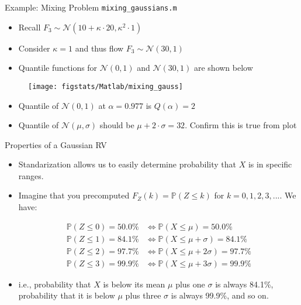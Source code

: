 \documentclass[9pt]{beamer}
\begin{document}
\begin{frame}{Example: Mixing Problem \footnotesize{\texttt{mixing\_gaussians.m}}}
\begin{itemize}
\setlength{\itemsep}{10pt}
\item Recall $F_3\sim\mathcal{N}(10+\kappa\cdot 20,\kappa^2\cdot 1)$
\item Consider $\kappa=1$ and thus flow $F_3\sim\mathcal{N}(30,1)$
\item Quantile functions for  $\mathcal{N}(0,1)$ and $\mathcal{N}(30,1)$ are shown below
\end{itemize}
\begin{figure}[!htb]
    \centering
	\texttt{[image: figstats/Matlab/mixing\_gauss]}
\end{figure}
\begin{itemize}
\item Quantile of $\mathcal{N}(0,1)$ at $\alpha=0.977$ is  $Q(\alpha)=2$
\item Quantile of  $\mathcal{N}(\mu,\sigma)$ should be $\mu+2\cdot \sigma=32$.  Confirm this is true from plot
\end{itemize}
\end{frame}

%
\begin{frame}{Properties of a Gaussian RV}

\begin{itemize}
\setlength{\itemsep}{10pt}

\item Standarization allows us to easily determine probability that $X$ is in specific ranges.

\item Imagine that you precomputed $F_Z(k)=\mathbb{P}(Z\leq k)$ for $k=0,1,2,3,...$. We have:
\begin{block}{}
\begin{align*}
\mathbb{P}(Z\leq 0)=50.0\%&\Longleftrightarrow\mathbb{P}(X\leq \mu)=50.0\%\\
\mathbb{P}(Z\leq 1)=84.1\%&\Longleftrightarrow\mathbb{P}(X\leq \mu+\sigma)=84.1\%\\
\mathbb{P}(Z\leq 2)=97.7\%&\Longleftrightarrow\mathbb{P}(X\leq \mu+2\sigma)=97.7\%\\
\mathbb{P}(Z\leq 3)=99.9\%&\Longleftrightarrow\mathbb{P}(X\leq \mu+3\sigma)=99.9\%
\end{align*}
\end{block}
\item i.e., probability that $X$ is below its mean $\mu$ plus one $\sigma$ is always 84.1\%, probability that it is below $\mu$ plus three $\sigma$ is always 99.9\%, and so on.  
\end{itemize} 

\end{frame}
\end{document}

